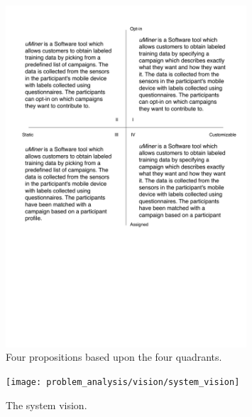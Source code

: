 \begin{figure}[!htbp]
	\centering
	\includegraphics[width=0.8\textwidth]{graphic/problem_analysis/vision/propositions.pdf}
	\caption{Four propositions based upon the four quadrants.}
	\label{fig:proposition}
\end{figure}
\FloatBarrier

\begin{figure}[!htbp]
    \centering
    \texttt{[image: problem\_analysis/vision/system\_vision]}
    \caption{The system vision.}
    \label{fig:system_vision}
\end{figure}
\FloatBarrier